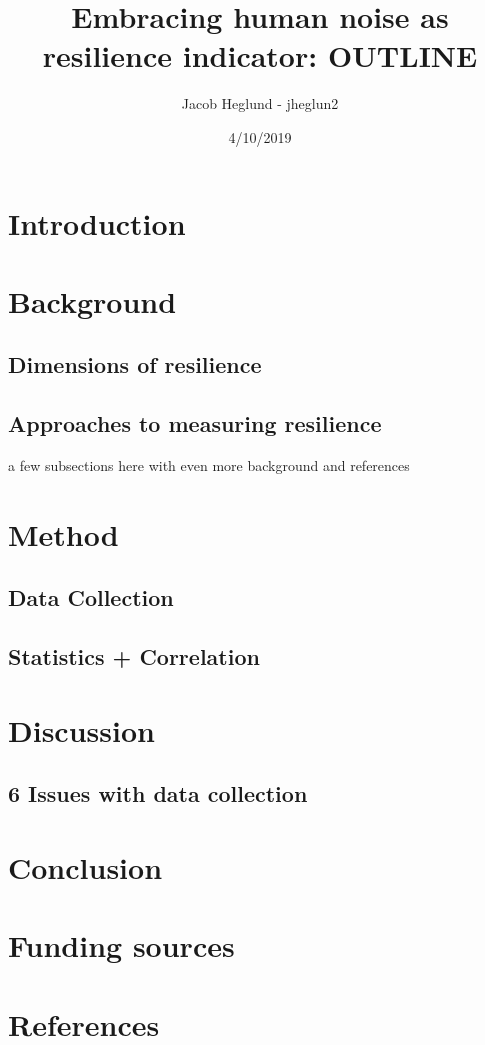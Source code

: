 \documentclass[11pt]{article}
\title{Embracing human noise as resilience indicator: OUTLINE}
\author{Jacob Heglund - jheglun2}
\date{4/10/2019}
\begin{document}
\maketitle

\section{Introduction}

\section{Background}
\subsection{Dimensions of resilience}
\subsection{Approaches to measuring resilience}
a few subsections here with even more background and references

\section{Method}
\subsection{Data Collection}
\subsection{Statistics + Correlation}

\section{Discussion}
\subsection{6 Issues with data collection}

\section{Conclusion}

\section{Funding sources}

\section{References}
\end{document}
